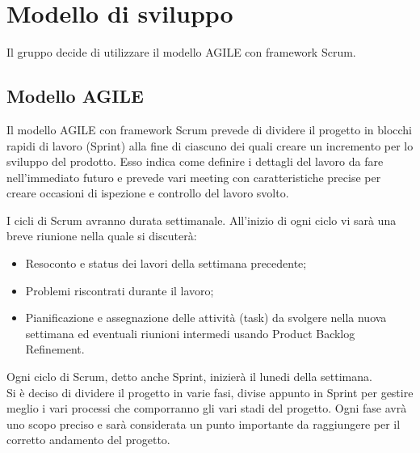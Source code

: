\section{Modello di sviluppo}
Il gruppo decide di utilizzare il modello AGILE con framework Scrum.

\subsection{Modello AGILE}
Il modello AGILE con framework Scrum prevede di dividere il progetto in blocchi rapidi di lavoro (Sprint) 
alla fine di ciascuno dei quali creare un incremento per lo sviluppo del prodotto. 
Esso indica come definire i dettagli del lavoro da fare nell'immediato futuro e prevede 
vari meeting con caratteristiche precise per creare occasioni di ispezione e controllo del lavoro svolto.

I cicli di Scrum avranno durata settimanale. All'inizio di ogni ciclo vi sarà una breve riunione nella quale si discuterà:
\begin{itemize}
	\item Resoconto e status dei lavori della settimana precedente;
	\item Problemi riscontrati durante il lavoro;
	\item Pianificazione e assegnazione delle attività (task) da svolgere nella nuova settimana ed eventuali riunioni intermedi usando Product Backlog Refinement.
\end{itemize}
Ogni ciclo di Scrum, detto anche Sprint, inizierà il lunedi della settimana.\\
Si è deciso di dividere il progetto in varie fasi, divise appunto in Sprint per gestire meglio i vari processi che comporranno gli vari stadi del progetto. Ogni fase avrà uno scopo preciso e sarà considerata un punto importante da raggiungere per il corretto andamento del progetto.